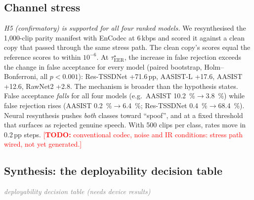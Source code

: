 \documentclass[journal]{IEEEtran}
\newcommand{\todo}[1]{\textcolor{red}{[\textbf{TODO:} #1]}}
\newcommand{\placeholder}[1]{\textcolor{gray}{\emph{#1}}}
\newcommand{\eer}{\mathrm{EER}}
\newcommand{\taustar}{\tau^{\star}}
\begin{document}
\subsection{Channel stress}
\label{sec:res-stress}
\emph{H5 (confirmatory) is supported for all four ranked models.} We
resynthesised the 1,000-clip parity manifest with EnCodec at 6\,kbps and
scored it against a clean copy that passed through the same stress path. The
clean copy's scores equal the reference scores to within \(10^{-6}\). At
\(\taustar_{\eer}\), the increase in false rejection exceeds the change in
false acceptance for every model (paired bootstrap, Holm--Bonferroni, all
\(p<0.001\)): Res-TSSDNet +71.6\,pp, AASIST-L +17.6, AASIST +12.6, RawNet2
+2.8. The mechanism is broader than the hypothesis states. False acceptance
\emph{falls} for all four models (e.g.\ AASIST
\SI{10.2}{\percent}\(\to\)\SI{3.8}{\percent}) while false rejection rises
(AASIST \SI{0.2}{\percent}\(\to\)\SI{6.4}{\percent}; Res-TSSDNet
\SI{0.4}{\percent}\(\to\)\SI{68.4}{\percent}). Neural resynthesis pushes
\emph{both} classes toward ``spoof'', and at a fixed threshold that surfaces
as rejected genuine speech. With 500 clips per class, rates move in 0.2\,pp
steps. \todo{conventional codec, noise and IR conditions: stress path wired,
not yet generated.}

\subsection{Synthesis: the deployability decision table}
\label{sec:res-synth}
\placeholder{deployability decision table (needs device results)}

\end{document}
